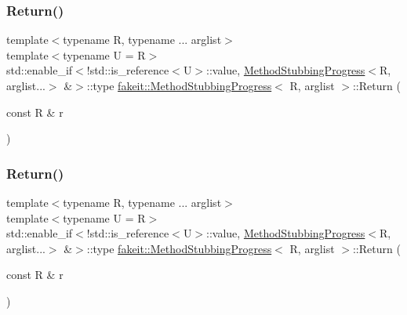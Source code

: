 \mbox{\label{structfakeit_1_1MethodStubbingProgress_ab97be63c322887db40cb788d28875fea}} 
\subsubsection{\texorpdfstring{Return()}{Return()}\hspace{0.1cm}{\footnotesize\ttfamily [8/45]}}
{\footnotesize\ttfamily template$<$typename R, typename ... arglist$>$ \\
template$<$typename U  = R$>$ \\
std\+::enable\+\_\+if$<$!std\+::is\+\_\+reference$<$U$>$\+::value, \mbox{\hyperlink{structfakeit_1_1MethodStubbingProgress}{Method\+Stubbing\+Progress}}$<$R, arglist...$>$ \&$>$\+::type \mbox{\hyperlink{structfakeit_1_1MethodStubbingProgress}{fakeit\+::\+Method\+Stubbing\+Progress}}$<$ R, arglist $>$\+::Return (\begin{DoxyParamCaption}\item[{const R \&}]{r }\end{DoxyParamCaption})\hspace{0.3cm}{\ttfamily [inline]}}

\mbox{\label{structfakeit_1_1MethodStubbingProgress_ab97be63c322887db40cb788d28875fea}} 
\subsubsection{\texorpdfstring{Return()}{Return()}\hspace{0.1cm}{\footnotesize\ttfamily [9/45]}}
{\footnotesize\ttfamily template$<$typename R, typename ... arglist$>$ \\
template$<$typename U  = R$>$ \\
std\+::enable\+\_\+if$<$!std\+::is\+\_\+reference$<$U$>$\+::value, \mbox{\hyperlink{structfakeit_1_1MethodStubbingProgress}{Method\+Stubbing\+Progress}}$<$R, arglist...$>$ \&$>$\+::type \mbox{\hyperlink{structfakeit_1_1MethodStubbingProgress}{fakeit\+::\+Method\+Stubbing\+Progress}}$<$ R, arglist $>$\+::Return (\begin{DoxyParamCaption}\item[{const R \&}]{r }\end{DoxyParamCaption})\hspace{0.3cm}{\ttfamily [inline]}}

